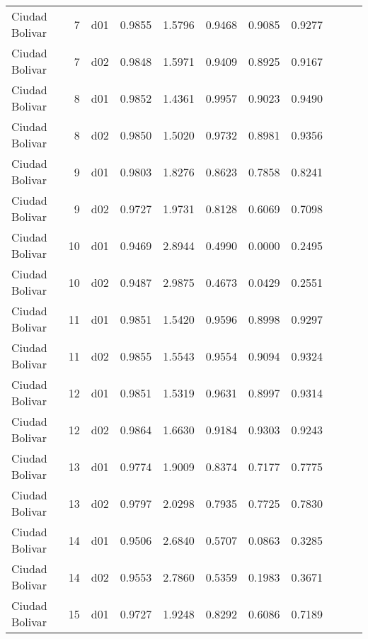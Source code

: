\begin{landscape}
\begin{longtable}{p{2cm}rrrrrrrrrr}
       Ciudad Bolivar  &          7 &     d01 &   0.9855 &  1.5796 &        0.9468 &           0.9085 &  0.9277 \\
       Ciudad Bolivar  &          7 &     d02 &   0.9848 &  1.5971 &        0.9409 &           0.8925 &  0.9167 \\
       Ciudad Bolivar  &          8 &     d01 &   0.9852 &  1.4361 &        0.9957 &           0.9023 &  0.9490 \\
       Ciudad Bolivar  &          8 &     d02 &   0.9850 &  1.5020 &        0.9732 &           0.8981 &  0.9356 \\
       Ciudad Bolivar  &          9 &     d01 &   0.9803 &  1.8276 &        0.8623 &           0.7858 &  0.8241 \\
       Ciudad Bolivar  &          9 &     d02 &   0.9727 &  1.9731 &        0.8128 &           0.6069 &  0.7098 \\
       Ciudad Bolivar  &         10 &     d01 &   0.9469 &  2.8944 &        0.4990 &           0.0000 &  0.2495 \\
       Ciudad Bolivar  &         10 &     d02 &   0.9487 &  2.9875 &        0.4673 &           0.0429 &  0.2551 \\
       Ciudad Bolivar  &         11 &     d01 &   0.9851 &  1.5420 &        0.9596 &           0.8998 &  0.9297 \\
       Ciudad Bolivar  &         11 &     d02 &   0.9855 &  1.5543 &        0.9554 &           0.9094 &  0.9324 \\
       Ciudad Bolivar  &         12 &     d01 &   0.9851 &  1.5319 &        0.9631 &           0.8997 &  0.9314 \\
       Ciudad Bolivar  &         12 &     d02 &   0.9864 &  1.6630 &        0.9184 &           0.9303 &  0.9243 \\
       Ciudad Bolivar  &         13 &     d01 &   0.9774 &  1.9009 &        0.8374 &           0.7177 &  0.7775 \\
       Ciudad Bolivar  &         13 &     d02 &   0.9797 &  2.0298 &        0.7935 &           0.7725 &  0.7830 \\
       Ciudad Bolivar  &         14 &     d01 &   0.9506 &  2.6840 &        0.5707 &           0.0863 &  0.3285 \\
       Ciudad Bolivar  &         14 &     d02 &   0.9553 &  2.7860 &        0.5359 &           0.1983 &  0.3671 \\
       Ciudad Bolivar  &         15 &     d01 &   0.9727 &  1.9248 &        0.8292 &           0.6086 &  0.7189 \\

\end{longtable}
\end{landscape}
